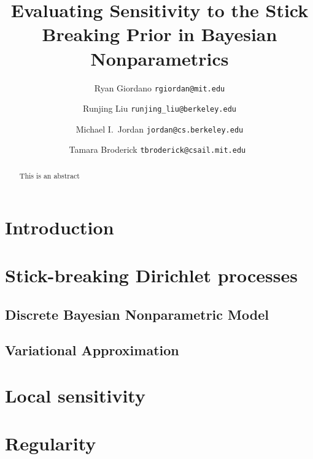 \documentclass[11pt]{article}
\begin{document}
\title{Evaluating Sensitivity to the Stick Breaking Prior in Bayesian Nonparametrics}

\author{Ryan Giordano \texttt{rgiordan@mit.edu} \\
        \and
        Runjing Liu \texttt{runjing\_liu@berkeley.edu} \\
        \and
        Michael I.\ Jordan \texttt{jordan@cs.berkeley.edu} \\
        \and
        Tamara Broderick \texttt{tbroderick@csail.mit.edu }
        }

\maketitle

\begin{abstract}%
This is an abstract
\end{abstract}

\section{Introduction}



\section{Stick-breaking Dirichlet processes}
    \subsection{Discrete Bayesian Nonparametric Model}
    

    \subsection{Variational Approximation}
    


\section{Local sensitivity}


\section{Regularity}

\end{document}
